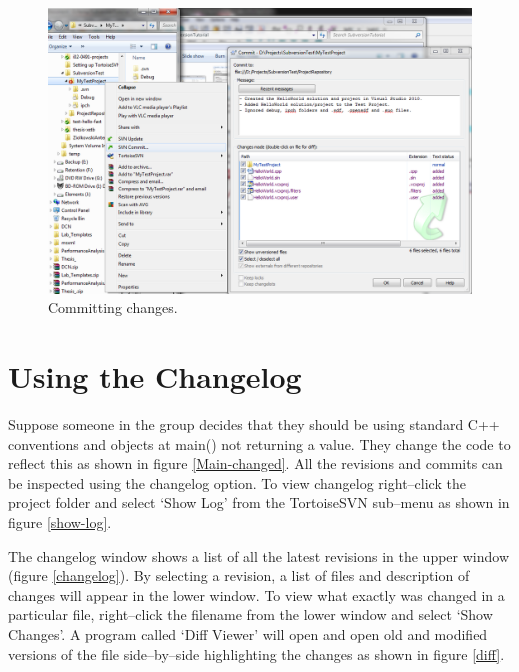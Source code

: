 \documentclass[12pt,a4paper]{article}
\begin{document}
\begin{figure}[H]
\centering
\includegraphics[scale=0.50]{CommitMessage.png}
\caption{Committing changes.}
\label{commit-message}
\end{figure}
\section{Using the Changelog}
Suppose someone in the group decides that they should be using standard C++ conventions and objects at main() not returning a value. They change the code to reflect this as shown in figure \ref{Main-changed}. All the revisions and commits can be inspected using the changelog option. To view changelog right--click the project folder and select `Show Log' from the TortoiseSVN sub--menu as shown in figure \ref{show-log}.

The changelog window shows a list of all the latest revisions in the upper window (figure \ref{changelog}). By selecting a revision, a list of files and description of changes will appear in the lower window. To view what exactly was changed in a particular file, right--click the filename from the lower window and select `Show Changes'. A program called `Diff Viewer' will open and open old and modified versions of the file side--by--side highlighting the changes as shown in figure \ref{diff}.
\end{document}
